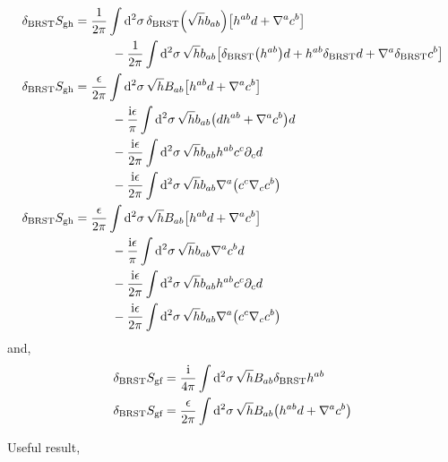 \begin{align*}
    \delta_{\textnormal{BRST}}S_{\textnormal{gh}}&=\frac{1}{2\pi}\int\dd[2]{\sigma}\delta_{\textnormal{BRST}}\qty(\sqrt{h}b_{ab})\qty[h^{ab}d+\nabla^ac^b]\\
    &\quad\quad\quad-\frac{1}{2\pi}\int\dd[2]{\sigma}\sqrt{h}b_{ab}\qty[\delta_{\textnormal{BRST}}\qty(h^{ab})d+h^{ab}\delta_{\textnormal{BRST}}d+\nabla^a\delta_{\textnormal{BRST}}c^b]\\
    \delta_{\textnormal{BRST}}S_{\textnormal{gh}}&=\frac{\epsilon}{2\pi}\int\dd[2]{\sigma}\sqrt{h}B_{ab}\qty[h^{ab}d+\nabla^ac^b]\\
    &\quad\quad\quad-\frac{\textnormal{i}\epsilon}{\pi}\int\dd[2]{\sigma}\sqrt{h}b_{ab}\qty(dh^{ab}+\nabla^ac ^b)d\\
    &\quad\quad\quad-\frac{\textnormal{i}\epsilon}{2\pi}\int\dd[2]{\sigma}\sqrt{h}b_{ab}h^{ab}c^c\partial_cd\\
    &\quad\quad\quad-\frac{\textnormal{i}\epsilon}{2\pi}\int\dd[2]{\sigma}\sqrt{h}b_{ab}\nabla^a\qty(c ^c\nabla_ cc^b)\\
    \delta_{\textnormal{BRST}}S_{\textnormal{gh}}&=\frac{\epsilon}{2\pi}\int\dd[2]{\sigma}\sqrt{h}B_{ab}\qty[h^{ab}d+\nabla^ac^b]\\
    &\quad\quad\quad-\frac{\textnormal{i}\epsilon}{\pi}\int\dd[2]{\sigma}\sqrt{h}b_{ab}\nabla^ac ^bd\\
    &\quad\quad\quad-\frac{\textnormal{i}\epsilon}{2\pi}\int\dd[2]{\sigma}\sqrt{h}b_{ab}h^{ab}c^c\partial_cd\\
    &\quad\quad\quad-\frac{\textnormal{i}\epsilon}{2\pi}\int\dd[2]{\sigma}\sqrt{h}b_{ab}\nabla^a\qty(c ^c\nabla_ cc^b)
\end{align*}
and,
\begin{align*}
    \delta_{\textnormal{BRST}}S_{\textnormal{gf}}&=\frac{\textnormal{i}}{4\pi}\int\dd[2]{\sigma}\sqrt{h}B_{ab}\delta_{\textnormal{BRST}}h^{ab}\\
    \delta_{\textnormal{BRST}}S_{\textnormal{gf}}&=\frac{\epsilon}{2\pi}\int\dd[2]{\sigma}\sqrt{h}B_{ab}\qty(h^{ab}d+\nabla^ac ^b)
\end{align*}





















Useful result,

